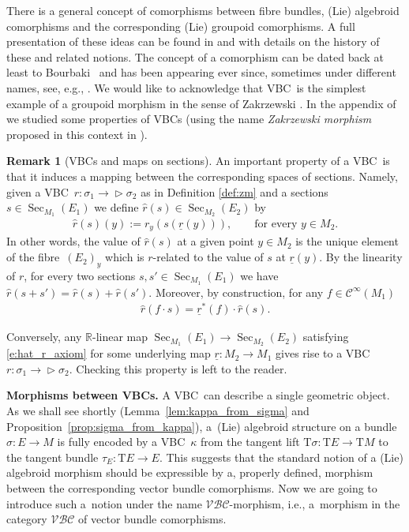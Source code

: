 \documentclass[pdftex]{sigma}
\newcommand{\ZM}{{VBC}} %
\newcommand{\Zakrzewski}{{vector bundle comorphism}}
\newcommand{\und}{\underline}
\newcommand{\Sec}{\operatorname{Sec}}
\newcommand{\ra}{\rightarrow}
\newcommand{\T}{\mathrm{T}} %
\newcommand{\catZM}{{\mathcal{VBC}}} %
\newcommand{\Cf}{\mathcal{C}^\infty}
\def\relto{\rightarrow\!\!\vartriangleright} %
\numberwithin{equation}{section}
\theoremstyle{definition}
\newtheorem{rem}[thm]{Remark}
\begin{document}
There is a general concept of comorphisms between fibre bundles, (Lie) algebroid comorphisms and the corresponding (Lie) groupoid comorphisms. A full presentation of these ideas can be found in \cite{Cattaneo_Dherin_Weinstein_2012} and \cite{Mackenzie_lie_2005} with details on the history of these and related notions. The concept of a comorphism can be dated back at least to Bourbaki~\cite{Bourbaki_1971} and has been appearing ever since, sometimes under different names, see, e.g., \cite{Guillemin_Sternberg_1977,Higgins_Mackenzie_1990,Huebschmann_1990}. We would like to acknowledge that \ZM\ is the simplest example of a groupoid morphism in the sense of Zakrzewski \cite{Zakrz_quant_class_pseud_I_1990,Zakrz_quant_class_pseud_II_1990}. In the appendix of~\cite{MJ_MR_models_high_alg_2015} we studied some properties of \ZM s (using the name \emph{Zakrzewski morphism} proposed in this context in \cite{GG_var_calc_gen_alg_2008}).

\begin{rem}[\ZM s and maps on sections]\label{rem:zm_sections}
An important property of a \ZM\ is that it induces a mapping between the corresponding spaces of sections. Namely, given a \ZM\ $r\colon \sigma_1 \relto \sigma_2$ as in Definition \ref{def:zm} and a sections $s\in \Sec_{M_1}(E_1)$ we define $\hat{r}(s)\in \Sec_{M_2}(E_2)$ by
\begin{gather*}
\hat{r}(s) (y):= r_y(s(\und{r}(y))),\qquad \text{for every $y\in M_2$.}
\end{gather*}
In other words, the value of $\hat{r}(s)$ at a given point $y\in M_2$ is the unique element of the fibre~$(E_2)_y$ which is $r$-related to the value of $s$ at $\und{r}(y)$.
By the linearity of $r$, for every two sections $s,s'\in \Sec_{M_1}(E_1)$ we have $\hat{r}(s+s')=\hat{r}(s)+\hat{r}(s')$. Moreover, by construction, for any $f\in\Cf(M_1)$
\begin{gather}\label{e:hat_r_axiom}
\hat{r}(f\cdot s) = \und{r}^\ast(f) \cdot \hat{r}(s) .
\end{gather}

Conversely, any ${\mathbb R}$-linear map $\Sec_{M_1}(E_1)\ra \Sec_{M_2}(E_2)$ satisfying \eqref{e:hat_r_axiom} for some underlying map $\und{r}\colon M_2\ra M_1$ gives rise to a \ZM\ $r\colon \sigma_1\relto \sigma_2$. Checking this property is left to the reader.
\end{rem}

{\bf Morphisms between \ZM s.} A \ZM\ can describe a single geometric object. As we shall see shortly (Lemma~\ref{lem:kappa_from_sigma} and Proposition~\ref{prop:sigma_from_kappa}), a~(Lie) algebroid structure on a bundle $\sigma\colon E\ra M$ is fully encoded by a \ZM\ $\kappa$ from the tangent lift $\T\sigma\colon \T E\ra\T M$ to the tangent bundle \mbox{$\tau_E\colon \T E\ra E$}. This suggests that the standard notion of a (Lie) algebroid morphism should be expressible by a, properly defined, morphism between the corresponding \Zakrzewski s. Now we are going to introduce such a~notion under the name $\catZM$-morphism, i.e., a~morphism in the category $\catZM$ of \Zakrzewski s.
\end{document}
